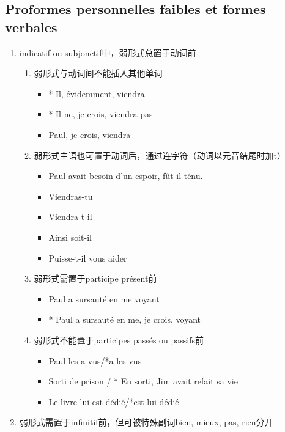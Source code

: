 \documentclass[UTF8]{report}
\begin{document}
\subsection{Proformes personnelles faibles et formes verbales}
\begin{enumerate}
    \item indicatif ou subjonctif中，弱形式总置于动词前
    \begin{enumerate}
        \item 弱形式与动词间不能插入其他单词
        \begin{itemize}
            \item * Il, évidemment, viendra
            \item * Il ne, je crois, viendra pas
            \item Paul, je crois, viendra
        \end{itemize}
        \item 弱形式主语也可置于动词后，通过连字符（动词以元音结尾时加t）
        \begin{itemize}
            \item Paul avait besoin d’un espoir, fût-il ténu.
            \item Viendras-tu
            \item Viendra-t-il
            \item Ainsi soit-il
            \item Puisse-t-il vous aider
        \end{itemize}
        \item 弱形式需置于participe présent前
        \begin{itemize}
            \item Paul a sursauté en me voyant
            \item * Paul a sursauté en me, je crois, voyant
        \end{itemize}
        \item 弱形式不能置于participes passés ou passifs前
        \begin{itemize}
            \item Paul les a vus/*a les vus
            \item Sorti de prison / * En sorti, Jim avait refait sa vie
            \item Le livre lui est dédié/*est lui dédié
        \end{itemize}
    \end{enumerate}
    \item 弱形式需置于infinitif前，但可被特殊副词bien, mieux, pas, rien分开

\end{enumerate}
\end{document}
